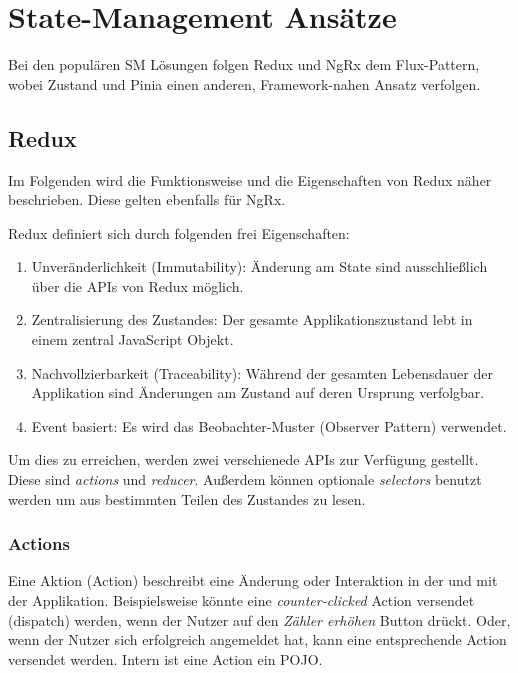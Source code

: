 \chapter{State-Management Ansätze}

Bei den populären SM Lösungen folgen Redux und NgRx dem Flux-Pattern\cite{historyOfRedux}\cite{ngrxGettingStarted}, wobei Zustand und Pinia einen anderen, Framework-nahen Ansatz verfolgen.

\section{Redux}

Im Folgenden wird die Funktionsweise und die Eigenschaften von Redux näher beschrieben. Diese gelten ebenfalls für NgRx.

Redux definiert sich durch folgenden frei Eigenschaften:
\begin{enumerate}
  \item Unveränderlichkeit (Immutability): Änderung am State sind ausschließlich über die APIs von Redux möglich.
  \item Zentralisierung des Zustandes: Der gesamte Applikationszustand lebt in einem zentral JavaScript Objekt.
  \item Nachvollzierbarkeit (Traceability): Während der gesamten Lebensdauer der Applikation sind Änderungen am Zustand auf deren Ursprung verfolgbar.
  \item Event basiert: Es wird das Beobachter-Muster (Observer Pattern) verwendet.
\end{enumerate}

Um dies zu erreichen, werden zwei verschienede APIs zur Verfügung gestellt. Diese sind \textit{actions} und \textit{reducer}. Außerdem können optionale \textit{selectors} benutzt werden um aus bestimmten Teilen des Zustandes zu lesen.

\subsection{Actions}

Eine Aktion (Action) beschreibt eine Änderung oder Interaktion in der und mit der Applikation. Beispielsweise könnte eine \textit{counter-clicked} Action versendet (dispatch) werden, wenn der Nutzer auf den \textit{Zähler erhöhen} Button drückt. Oder, wenn der Nutzer sich erfolgreich angemeldet hat, kann eine entsprechende Action versendet werden. Intern ist eine Action ein POJO.\cite{reduxStateActionReducers}

